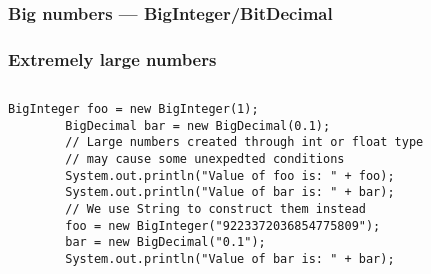 \documentclass[
  11pt, %
  xcolor=dvipsnames
]{beamer}
\begin{document}
\subsubsection{Big numbers --- BigInteger/BitDecimal}
\begin{frame}[fragile]
	\frametitle{Extremely large numbers}


	\begin{columns}[c]
		\begin{column}{0.9\textwidth}

			\begin{lstlisting}[style=Java]
        BigInteger foo = new BigInteger(1);
        BigDecimal bar = new BigDecimal(0.1);
        // Large numbers created through int or float type
        // may cause some unexpedted conditions
        System.out.println("Value of foo is: " + foo);
        System.out.println("Value of bar is: " + bar);
        // We use String to construct them instead
        foo = new BigInteger("9223372036854775809");
        bar = new BigDecimal("0.1");
        System.out.println("Value of bar is: " + bar);
      \end{lstlisting}

		\end{column}
	\end{columns}

\end{frame}
\end{document}
